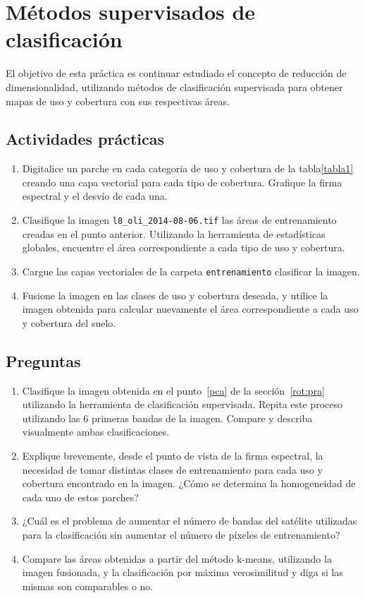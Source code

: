 \documentclass[hidelinks,12pt]{article}
\begin{document}
\newpage
\section{Métodos supervisados de clasificación}
El objetivo de esta práctica es continuar estudiado el concepto de reducción de 
dimensionalidad, utilizando métodos de clasificación supervisada para obtener 
mapas de uso y cobertura con sus respectivas áreas. 

\subsection{Actividades pr\'acticas}
\begin{enumerate}
    \item Digitalice un parche en cada categoria de uso y cobertura de la
    tabla\ref{tabla1} creando una capa vectorial para cada tipo de cobertura. 
    Grafique la firma espectral y el desvío de cada una. 
    \item Clasifique la imagen \texttt{l8\_oli\_2014-08-06.tif} las
    áreas de entrenamiento creadas en el punto anterior. Utilizando la herramienta
    de estadísticas globales, encuentre el área correspondiente a cada tipo de uso y
    cobertura.
    \item Cargue las capas vectoriales de la carpeta \texttt{entrenamiento} clasificar 
    la imagen.
    \item Fusione la imagen en las clases de uso y cobertura deseada, y utilice la
    imagen obtenida para calcular nuevamente el área correspondiente a cada uso y
    cobertura del suelo.
\end{enumerate}

\subsection{Preguntas}
\begin{enumerate}
    \item Clasifique la imagen obtenida en el punto~\ref{pca} de la secci\'on~\ref{rot:pra}
        utilizando la herramienta de clasificación supervisada.
        Repita este proceso utilizando las 6 primeras bandas de la imagen. 
        Compare y describa visualmente ambas clasificaciones.
    \item Explique brevemente, desde el punto de vista de la firma espectral, la
        necesidad de tomar distintas clases de entrenamiento para cada uso y
        cobertura encontrado en la imagen. ¿Cómo se determina la homogeneidad de
        cada uno de estos parches?
    \item ¿Cuál es el problema de aumentar el número de bandas del satélite
        utilizadas para la clasificación sin aumentar el número de píxeles de
        entrenamiento?
    \item Compare las áreas obtenidas a partir del método k-means, utilizando la
        imagen fusionada, y la clasificación por máxima verosimilitud y diga si
        las mismas son comparables o no.
\end{enumerate}
\end{document}
